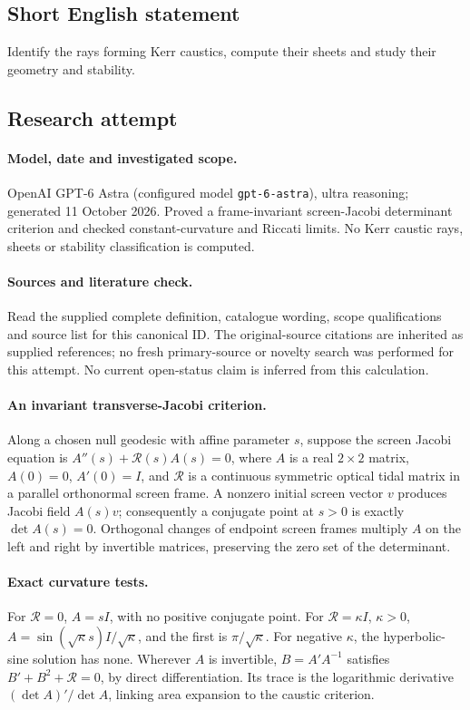 \documentclass[11pt]{article}
\begin{document}
\subsection{Short English statement}
Identify the rays forming Kerr caustics, compute their sheets and study their geometry and stability.
\subsection{Research attempt}
\paragraph{Model, date and investigated scope.}
OpenAI GPT-6 Astra (configured model \texttt{gpt-6-astra}), ultra reasoning; generated 11 October 2026. Proved a frame-invariant screen-Jacobi determinant criterion and checked constant-curvature and Riccati limits. No Kerr caustic rays, sheets or stability classification is computed.

\paragraph{Sources and literature check.}
Read the supplied complete definition, catalogue wording, scope qualifications and source list for this canonical ID. The original-source citations are inherited as supplied references; no fresh primary-source or novelty search was performed for this attempt. No current open-status claim is inferred from this calculation.

\paragraph{An invariant transverse-Jacobi criterion.}Along a chosen null geodesic with affine parameter \(s\), suppose the screen Jacobi equation is \(A''(s)+\mathcal R(s)A(s)=0\), where \(A\) is a real \(2\times2\) matrix, \(A(0)=0\), \(A'(0)=I\), and \(\mathcal R\) is a continuous symmetric optical tidal matrix in a parallel orthonormal screen frame. A nonzero initial screen vector \(v\) produces Jacobi field \(A(s)v\); consequently a conjugate point at \(s>0\) is exactly \(\det A(s)=0\). Orthogonal changes of endpoint screen frames multiply \(A\) on the left and right by invertible matrices, preserving the zero set of the determinant.
\paragraph{Exact curvature tests.}For \(\mathcal R=0\), \(A=sI\), with no positive conjugate point. For \(\mathcal R=\kappa I\), \(\kappa>0\), \(A=\sin(\sqrt\kappa s)I/\sqrt\kappa\), and the first is \(\pi/\sqrt\kappa\). For negative \(\kappa\), the hyperbolic-sine solution has none. Wherever \(A\) is invertible, \(B=A'A^{-1}\) satisfies \(B'+B^2+\mathcal R=0\), by direct differentiation. Its trace is the logarithmic derivative \((\det A)'/\det A\), linking area expansion to the caustic criterion.
\end{document}

